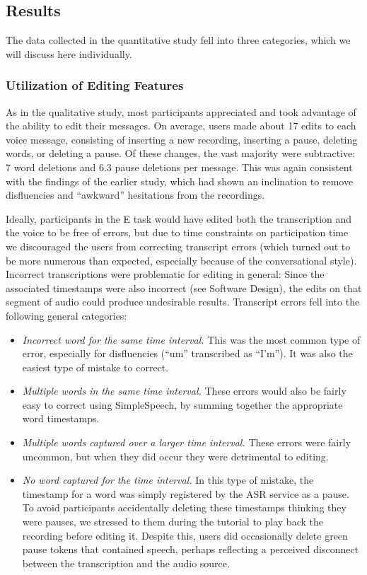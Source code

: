 \subsection{Results}
The data collected in the quantitative study fell into three categories, which we will discuss here individually.

\subsubsection{Utilization of Editing Features}
As in the qualitative study, most participants appreciated and took advantage of the ability to edit their messages.
On average, users made about 17 edits to each voice message, consisting of inserting a new recording, inserting a pause, deleting words, or deleting a pause. 
Of these changes, the vast majority were subtractive: 7 word deletions and 6.3 pause deletions per message.
This was again consistent with the findings of the earlier study, which had shown an inclination to remove disfluencies and ``awkward'' hesitations from the recordings.

Ideally, participants in the E task would have edited both the transcription and the voice to be free of errors, but due to time constraints on participation time we discouraged the users from correcting transcript errors (which turned out to be more numerous than expected, especially because of the conversational style).
Incorrect transcriptions were problematic for editing in general: Since the associated timestamps were also incorrect (see Software Design), the edits on that segment of audio could produce undesirable results. 
Transcript errors fell into the following general categories:

\begin{itemize}
	\item \emph{Incorrect word for the same time interval.} 
	This was the most common type of error, especially for disfluencies (``um'' transcribed as ``I'm''). 
	It was also the easiest type of mistake to correct.
	\item \emph{Multiple words in the same time interval.}
	These errors would also be fairly easy to correct using SimpleSpeech, by summing together the appropriate word timestamps.
	\item \emph{Multiple words captured over a larger time interval.}
	These errors were fairly uncommon, but when they did occur they were detrimental to editing.
	\item \emph{No word captured for the time interval.}
	In this type of mistake, the timestamp for a word was simply registered by the ASR service as a pause.
	To avoid participants accidentally deleting these timestamps thinking they were pauses, we stressed to them during the tutorial to play back the recording before editing it. 
	Despite this, users did occasionally delete green pause tokens that contained speech, perhaps reflecting a perceived disconnect between the transcription and the audio source.
\end{itemize}

